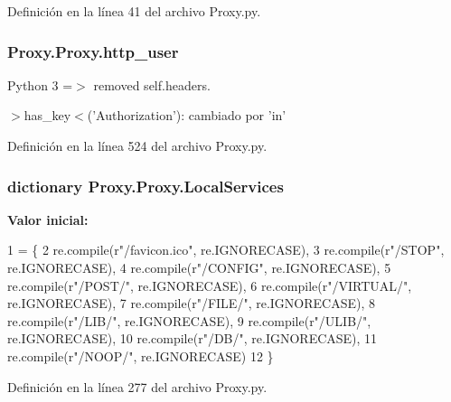 Definición en la línea 41 del archivo Proxy.\-py.

\hypertarget{class_proxy_1_1_proxy_a4d932c725d9b809b5ba5dc56d7d3d5aa}{
\subsubsection[{http\-\_\-user}]{\setlength{\rightskip}{0pt plus 5cm}Proxy.\-Proxy.\-http\-\_\-user}}\label{class_proxy_1_1_proxy_a4d932c725d9b809b5ba5dc56d7d3d5aa}


Python 3 =$>$ removed self.\-headers. 

$>$has\-\_\-key$<$('Authorization')\-: cambiado por 'in' 

Definición en la línea 524 del archivo Proxy.\-py.

\hypertarget{class_proxy_1_1_proxy_ab8904909599e432eceb2e73c44dca4ef}{
\subsubsection[{Local\-Services}]{\setlength{\rightskip}{0pt plus 5cm}dictionary Proxy.\-Proxy.\-Local\-Services\hspace{0.3cm}{\ttfamily [static]}}}\label{class_proxy_1_1_proxy_ab8904909599e432eceb2e73c44dca4ef}
{\bfseries Valor inicial\-:}
\begin{DoxyCode}
1 = \{
2         re.compile(\textcolor{stringliteral}{r"/favicon.ico"}, re.IGNORECASE),
3         re.compile(\textcolor{stringliteral}{r"/STOP"}, re.IGNORECASE),
4         re.compile(\textcolor{stringliteral}{r"/CONFIG"}, re.IGNORECASE),
5         re.compile(\textcolor{stringliteral}{r"/POST/"}, re.IGNORECASE),
6         re.compile(\textcolor{stringliteral}{r"/VIRTUAL/"}, re.IGNORECASE),
7         re.compile(\textcolor{stringliteral}{r"/FILE/"}, re.IGNORECASE),
8         re.compile(\textcolor{stringliteral}{r"/LIB/"}, re.IGNORECASE),
9         re.compile(\textcolor{stringliteral}{r"/ULIB/"}, re.IGNORECASE),
10         re.compile(\textcolor{stringliteral}{r"/DB/"}, re.IGNORECASE),
11         re.compile(\textcolor{stringliteral}{r"/NOOP/"}, re.IGNORECASE)
12     \}
\end{DoxyCode}


Definición en la línea 277 del archivo Proxy.\-py.

